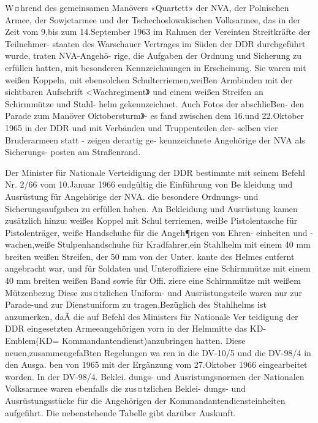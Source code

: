 

W¤hrend des gemeinsamen Manövers «Quartett»
der NVA, der Polnischen Armee, der Sowjetarmee
und der Tschechoslowakischen Volksarmee, das in
der Zeit vom 9,bis zum 14.September 1963 im
Rahmen der Vereinten Streitkräfte der Teilnehmer-
staaten des Warschauer Vertrages im Süden der
DDR durchgeführt wurde, traten NVA-Angehö-
rige, die Aufgaben der Ordnung und Sicherung zu
erfüllen hatten, mit besonderen Kennzeichnungen in Erscheinung. Sie waren mit weißen Koppeln, mit
ebensolchen Schulterriemen,weiBen Armbinden
mit der sichtbaren Aufschrift <Wachregiment》 und
einem weißen Streifen an Schirmmütze und Stahl-
helm gekennzeichnet. Auch Fotos der abschlieBen-
den Parade zum Manöver Oktobersturm》- es
fand zwischen dem 16.und 22.Oktober 1965 in der
DDR und mit Verbänden und Truppenteilen der-
selben vier Bruderarmeen statt - zeigen derartig ge-
kennzeichnete Angehörige der NVA als Sicherungs-
posten am Straßenrand.

Der Minister für Nationale Verteidigung der DDR bestimmte mit seinem Befehl Nr. 2/66 vom
10.Januar 1966 endgültig die Einführung von Be
kleidung und Ausrüstung für Angehörige der NVA.
die besondere Ordnungs- und Sicherungsaufgaben
zu erfüllen haben. An Bekleidung und Ausrüstung
kamen zusätzlich hinzu: weißes Koppel mit Schul
terriemen, weiBe Pistolentasche für Pistolenträger,
weiße Handschuhe für die Angeh¶rigen von Ehren-
einheiten und -wachen,weiße Stulpenhandschuhe
für Kradfahrer,ein Stahlhelm mit einem 40 mm
breiten weißen Streifen, der 50 mm von der Unter.
kante des Helmes entfernt angebracht war, und für
Soldaten und Unteroffiziere eine Schirmmütze mit
einem 40 mm breiten weißen Band sowie für Offi.
ziere eine Schirmmütze mit weißem Mützenbezug
Diese zus¤tzlichen Uniform- und Ausrüstungsteile
waren nur zur Parade-und zur Dienstuniform zu
tragen,Bezüglich des Stahlhelms ist anzumerken,
daÃ die auf Befehl des Ministers für Nationale Ver
teidigung der DDR eingesetzten Armeeangehörigen
vorn in der Helmmitte das KD-Emblem(KD=
Kommandantendienst)anzubringen hatten.
Diese neuen,zusammengefaBten Regelungen wa
ren in die DV-10/5 und die DV-98/4 in den Ausga.
ben von 1965 mit der Ergänzung vom 27.Oktober
1966 eingearbeitet worden. In der DV-98/4. Beklei.
dungs- und Ausristungsnormen der Nationalen
Volksarmee waren ebenfalls die zus¤tzlichen Beklei-
dungs- und Ausrüstungsstücke für die Angehörigen
der Kommandantendiensteinheiten aufgefihrt. Die
nebenstehende Tabelle gibt darüber Auskunft. 